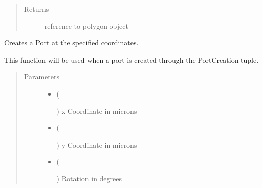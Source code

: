 \documentclass[a4paper,10pt,english]{sphinxmanual}
\begin{document}
\begin{fulllineitems}
\begin{fulllineitems}
\begin{quote}
\begin{description}
\begin{itemize}
\end{itemize}

\item[{Returns}] \leavevmode
reference to polygon object

\end{description}\end{quote}

\end{fulllineitems}


\begin{fulllineitems}
\label{\detokenize{photonics:kppc.photonics.PhotDevice.create_port}}
Creates a Port at the specified coordinates.

This function will be used when a port is created through the PortCreation tuple.
\begin{quote}\begin{description}
\item[{Parameters}] \leavevmode\begin{itemize}
\item {} 
 (%
\begin{footnote}[50]\sphinxAtStartFootnote
{}
%
\end{footnote}) \textendash{} x Coordinate in microns

\item {} 
 (%
\begin{footnote}[51]\sphinxAtStartFootnote
{}
%
\end{footnote}) \textendash{} y Coordinate in microns

\item {} 
 (%
\begin{footnote}[52]\sphinxAtStartFootnote
{}
%
\end{footnote}) \textendash{} Rotation in degrees


\end{itemize}
\end{description}
\end{quote}
\end{fulllineitems}
\end{fulllineitems}
\end{document}
